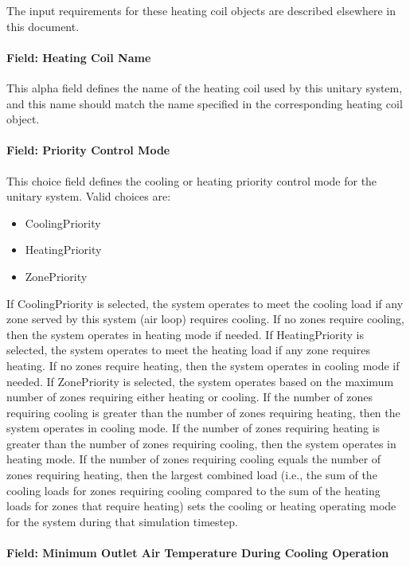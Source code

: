 The input requirements for these heating coil objects are described elsewhere in this document.

\paragraph{Field: Heating Coil Name}\label{field-heating-coil-name-8}

This alpha field defines the name of the heating coil used by this unitary system, and this name should match the name specified in the corresponding heating coil object.

\paragraph{Field: Priority Control Mode}\label{field-priority-control-mode}

This choice field defines the cooling or heating priority control mode for the unitary system. Valid choices are:

\begin{itemize}
\item
  CoolingPriority
\item
  HeatingPriority
\item
  ZonePriority
\end{itemize}

If CoolingPriority is selected, the system operates to meet the cooling load if any zone served by this system (air loop) requires cooling. If no zones require cooling, then the system operates in heating mode if needed. If HeatingPriority is selected, the system operates to meet the heating load if any zone requires heating. If no zones require heating, then the system operates in cooling mode if needed. If ZonePriority is selected, the system operates based on the maximum number of zones requiring either heating or cooling. If the number of zones requiring cooling is greater than the number of zones requiring heating, then the system operates in cooling mode. If the number of zones requiring heating is greater than the number of zones requiring cooling, then the system operates in heating mode. If the number of zones requiring cooling equals the number of zones requiring heating, then the largest combined load (i.e., the sum of the cooling loads for zones requiring cooling compared to the sum of the heating loads for zones that require heating) sets the cooling or heating operating mode for the system during that simulation timestep.

\paragraph{Field: Minimum Outlet Air Temperature During Cooling Operation}\label{field-minimum-outlet-air-temperature-during-cooling-operation}

